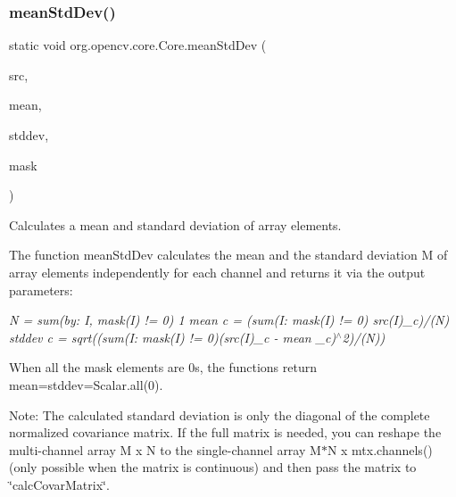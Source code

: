 \subsubsection{\texorpdfstring{mean\+Std\+Dev()}{meanStdDev()}\hspace{0.1cm}{\footnotesize\ttfamily [1/2]}}
{\footnotesize\ttfamily static void org.\+opencv.\+core.\+Core.\+mean\+Std\+Dev (\begin{DoxyParamCaption}\item[{\mbox{\hyperlink{classorg_1_1opencv_1_1core_1_1_mat}{Mat}}}]{src,  }\item[{\mbox{\hyperlink{classorg_1_1opencv_1_1core_1_1_mat_of_double}{Mat\+Of\+Double}}}]{mean,  }\item[{\mbox{\hyperlink{classorg_1_1opencv_1_1core_1_1_mat_of_double}{Mat\+Of\+Double}}}]{stddev,  }\item[{\mbox{\hyperlink{classorg_1_1opencv_1_1core_1_1_mat}{Mat}}}]{mask }\end{DoxyParamCaption})\hspace{0.3cm}{\ttfamily [static]}}

Calculates a mean and standard deviation of array elements.

The function {\ttfamily mean\+Std\+Dev} calculates the mean and the standard deviation {\ttfamily M} of array elements independently for each channel and returns it via the output parameters\+:

{\itshape N = sum(by\+: I, mask(\+I) != 0) 1 mean {\itshape c = (sum}(I\+: mask(\+I) != 0) src(\+I)\+\_\+c)/(N) stddev {\itshape c = sqrt((sum}(I\+: mask(\+I) != 0)(src(\+I)\+\_\+c -\/ mean \+\_\+c)$^\wedge$2)/(N)) }

When all the mask elements are 0\textquotesingle{}s, the functions return {\ttfamily mean=stddev=Scalar.\+all(0)}.

Note\+: The calculated standard deviation is only the diagonal of the complete normalized covariance matrix. If the full matrix is needed, you can reshape the multi-\/channel array {\ttfamily M x N} to the single-\/channel array {\ttfamily M$\ast$N x mtx.\+channels()} (only possible when the matrix is continuous) and then pass the matrix to \char`\"{}calc\+Covar\+Matrix\char`\"{}.


